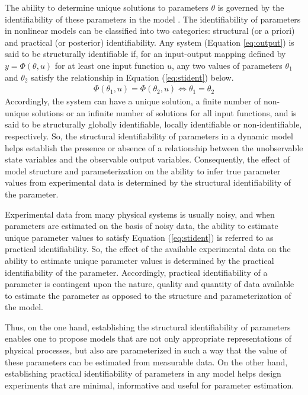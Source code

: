 \documentclass[10pt]{article}
\begin{document}
	The ability to determine unique solutions to parameters $\theta$ is governed by the identifiability of these parameters in the model \parencite{McLean2012, Raue2009a}. The identifiability of parameters in nonlinear models can be classified into two categories: structural (or a priori) and practical (or posterior) identifiability. 	
	Any system (Equation \ref{eq:output}) is said to be structurally identifiable if, for an input-output mapping defined by $y = \Phi(\theta,u)$ for at least one input function $u$, any two values of parameters $\theta_1$ and $\theta_2$ satisfy the relationship in Equation (\ref{eq:stident}) below.
	\begin{align}\label{eq:stident}
	\Phi(\theta_1,u) = \Phi(\theta_2,u) \iff \theta_1 = \theta_2
	\end{align}
	Accordingly, the system can have a unique solution, a finite number of non-unique solutions or an infinite number of solutions for all input functions, and is said to be structurally globally identifiable, locally identifiable or non-identifiable, respectively. So, the structural identifiability of parameters in a dynamic model helps establish the presence or absence of a relationship between the unobservable state variables and the observable output variables. Consequently, the effect of model structure and parameterization on the ability to infer true parameter values from experimental data is determined by the structural identifiability of the parameter. 
	
	Experimental data from many physical systems is usually noisy, and when parameters are estimated on the basis of noisy data, the ability to estimate unique parameter values to satisfy Equation (\ref{eq:stident}) is referred to as practical identifiability. So, the effect of the available experimental data on the ability to estimate unique parameter values is determined by the practical identifiability of the parameter. Accordingly, practical identifiability of a parameter is contingent upon the nature, quality and quantity of data available to estimate the parameter as opposed to the structure and parameterization of the model. 
	
	Thus, on the one hand, establishing the structural identifiability of parameters enables one to propose models that are not only appropriate representations of physical processes, but also are parameterized in such a way that the value of these parameters can be estimated from measurable data. On the other hand, establishing practical identifiability of parameters in any model helps design experiments that are minimal, informative and useful for parameter estimation.
	
\end{document}
